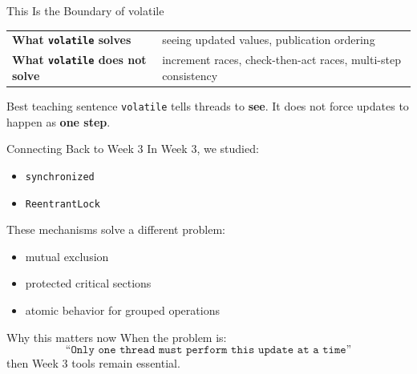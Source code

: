 \documentclass[aspectratio=169,11pt]{beamer}
\begin{document}
	\begin{frame}{This Is the Boundary of volatile}
		\begin{center}
			\begin{tabular}{>{\bfseries}m{3cm} m{6.7cm}}
				What \texttt{volatile} solves & seeing updated values, publication ordering \\
				What \texttt{volatile} does not solve & increment races, check-then-act races, multi-step consistency \\
			\end{tabular}
		\end{center}
		
		\vspace{0.4cm}
		
		\begin{alertblock}{Best teaching sentence}
			\texttt{volatile} tells threads to \textbf{see}.  
			It does not force updates to happen as \textbf{one step}.
		\end{alertblock}
	\end{frame}
	
	\begin{frame}{Connecting Back to Week 3}
		In Week 3, we studied:
		\begin{itemize}
			\item \texttt{synchronized}
			\item \texttt{ReentrantLock}
		\end{itemize}
		
		These mechanisms solve a different problem:
		\begin{itemize}
			\item mutual exclusion
			\item protected critical sections
			\item atomic behavior for grouped operations
		\end{itemize}
		
		\vspace{0.35cm}
		
		\begin{exampleblock}{Why this matters now}
			When the problem is:
			\[
			\texttt{``Only one thread must perform this update at a time''}
			\]
			then Week 3 tools remain essential.
		\end{exampleblock}
	\end{frame}
	
\end{document}

